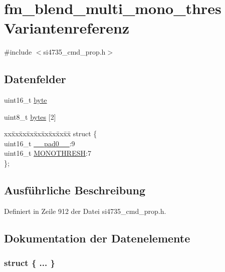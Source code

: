 \hypertarget{unionfm__blend__multi__mono__thres}{}\section{fm\+\_\+blend\+\_\+multi\+\_\+mono\+\_\+thres Variantenreferenz}
\label{unionfm__blend__multi__mono__thres}


{\ttfamily \#include $<$si4735\+\_\+cmd\+\_\+prop.\+h$>$}

\subsection*{Datenfelder}
\begin{DoxyCompactItemize}
\item 
uint16\+\_\+t \hyperlink{unionfm__blend__multi__mono__thres_ab0549c1b5ea980a02e7eab77e21fea49}{byte}
\item 
uint8\+\_\+t \hyperlink{unionfm__blend__multi__mono__thres_a46e4c05d20a047ec169f60d3167e912e}{bytes} \mbox{[}2\mbox{]}
\item 
\begin{tabbing}
xx\=xx\=xx\=xx\=xx\=xx\=xx\=xx\=xx\=\kill
struct \{\\
\>uint16\_t \hyperlink{unionfm__blend__multi__mono__thres_a77132c2c26a75f5b8751b235cda23828}{\_\_pad0\_\_}:9\\
\>uint16\_t \hyperlink{unionfm__blend__multi__mono__thres_a5de7498b6512934529d0c6284f120805}{MONOTHRESH}:7\\
\}; \\

\end{tabbing}\end{DoxyCompactItemize}


\subsection{Ausführliche Beschreibung}


Definiert in Zeile 912 der Datei si4735\+\_\+cmd\+\_\+prop.\+h.



\subsection{Dokumentation der Datenelemente}
\hypertarget{unionfm__blend__multi__mono__thres_adf4b9f100af09ecb25b0e6510f99a38d}{}\subsubsection[{"@113}]{\setlength{\rightskip}{0pt plus 5cm}struct \{ ... \} }\label{unionfm__blend__multi__mono__thres_adf4b9f100af09ecb25b0e6510f99a38d}
\hypertarget{unionfm__blend__multi__mono__thres_a77132c2c26a75f5b8751b235cda23828}{}
